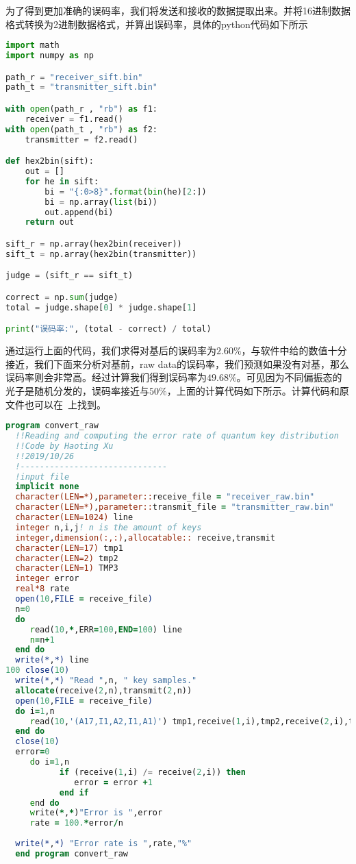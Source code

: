 \documentclass[11pt,a4paper]{ctexart}
\begin{document}
为了得到更加准确的误码率，我们将发送和接收的数据提取出来。并将16进制数据格式转换为2进制数据格式，并算出误码率，具体的python代码如下所示
\begin{lstlisting}[language=python,keywordstyle=\color{blue!70},commentstyle=\color{red!50!green!50!blue!50},frame=shadowbox, rulesepcolor=\color{red!20!green!20!blue!20}]
import math
import numpy as np

path_r = "receiver_sift.bin"
path_t = "transmitter_sift.bin"

with open(path_r , "rb") as f1:
    receiver = f1.read()
with open(path_t , "rb") as f2:
    transmitter = f2.read()

def hex2bin(sift):
    out = []
    for he in sift:
        bi = "{:0>8}".format(bin(he)[2:])
        bi = np.array(list(bi))
        out.append(bi)
    return out

sift_r = np.array(hex2bin(receiver))
sift_t = np.array(hex2bin(transmitter))

judge = (sift_r == sift_t)

correct = np.sum(judge)
total = judge.shape[0] * judge.shape[1]

print("误码率:", (total - correct) / total)
\end{lstlisting}

通过运行上面的代码，我们求得对基后的误码率为$2.60\%$，与软件中给的数值十分接近，我们下面来分析对基前，raw data的误码率，我们预测如果没有对基，那么误码率则会非常高。经过计算我们得到误码率为$49.68\%$。可见因为不同偏振态的光子是随机分发的，误码率接近与$50\%$，上面的计算代码如下所示。计算代码和原文件也可以在~\cite{gibhub}上找到。
\begin{lstlisting}[language=fortran,keywordstyle=\color{blue!70},commentstyle=\color{red!50!green!50!blue!50},frame=shadowbox, rulesepcolor=\color{red!20!green!20!blue!20}]
program convert_raw
  !!Reading and computing the error rate of quantum key distribution
  !!Code by Haoting Xu
  !!2019/10/26
  !------------------------------
  !input file
  implicit none 
  character(LEN=*),parameter::receive_file = "receiver_raw.bin"
  character(LEN=*),parameter::transmit_file = "transmitter_raw.bin"
  character(LEN=1024) line
  integer n,i,j! n is the amount of keys
  integer,dimension(:,:),allocatable:: receive,transmit
  character(LEN=17) tmp1
  character(LEN=2) tmp2
  character(LEN=1) TMP3
  integer error
  real*8 rate
  open(10,FILE = receive_file)
  n=0
  do
     read(10,*,ERR=100,END=100) line
     n=n+1
  end do
  write(*,*) line
100 close(10)
  write(*,*) "Read ",n, " key samples."
  allocate(receive(2,n),transmit(2,n))
  open(10,FILE = receive_file)
  do i=1,n
     read(10,'(A17,I1,A2,I1,A1)') tmp1,receive(1,i),tmp2,receive(2,i),tmp3
  end do
  close(10)
  error=0
     do i=1,n
           if (receive(1,i) /= receive(2,i)) then
              error = error +1
           end if
     end do
     write(*,*)"Error is ",error
     rate = 100.*error/n
     
  write(*,*) "Error rate is ",rate,"%"
  end program convert_raw
\end{lstlisting}
  
\end{document}
